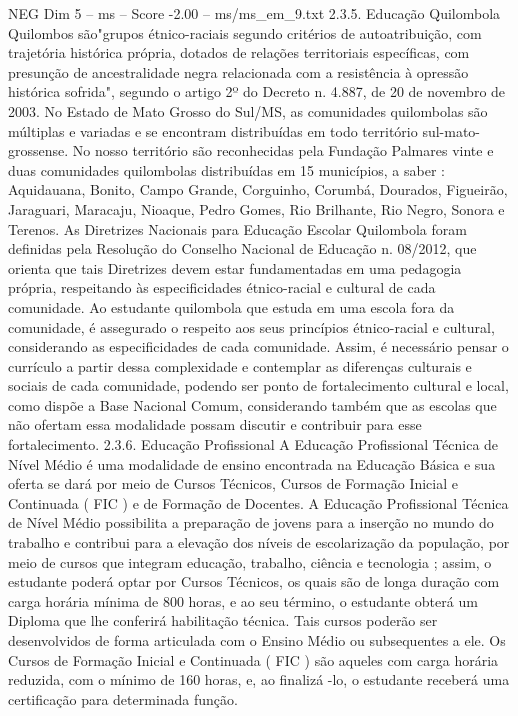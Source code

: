 \begin{textsample}{NEG Dim 5 – ms – Score -2.00 – ms/ms\_em\_9.txt}  \label{ex:f5_neg_071}
2.3.5.
Educação Quilombola Quilombos são"grupos étnico-raciais segundo critérios de autoatribuição, com trajetória histórica própria, dotados de relações territoriais específicas, com presunção de ancestralidade negra relacionada com a resistência à opressão histórica sofrida", segundo o artigo 2º do Decreto n. 4.887, de 20 de novembro de 2003.
No Estado de Mato Grosso do Sul/MS, as comunidades quilombolas são múltiplas e variadas e se encontram distribuídas em todo território sul-mato-grossense.
No nosso território são reconhecidas pela Fundação Palmares vinte e duas comunidades quilombolas distribuídas em 15 municípios, a saber : Aquidauana, Bonito, Campo Grande, Corguinho, Corumbá, Dourados, Figueirão, Jaraguari, Maracaju, Nioaque, Pedro Gomes, Rio Brilhante, Rio Negro, Sonora e Terenos.
As Diretrizes Nacionais para Educação Escolar Quilombola foram definidas pela Resolução do Conselho Nacional de Educação n. 08/2012, que orienta que tais Diretrizes devem estar fundamentadas em uma pedagogia própria, respeitando às especificidades étnico-racial e cultural de cada comunidade.
Ao estudante quilombola que estuda em uma escola fora da comunidade, é assegurado o respeito aos seus princípios étnico-racial e cultural, considerando as especificidades de cada comunidade.
Assim, é necessário pensar o currículo a partir dessa complexidade e contemplar as diferenças culturais e sociais de cada comunidade, podendo ser ponto de fortalecimento cultural e local, como dispõe a Base Nacional Comum, considerando também que as escolas que não ofertam essa modalidade possam discutir e contribuir para esse fortalecimento. 2.3.6.
Educação Profissional A Educação Profissional Técnica de Nível Médio é uma modalidade de ensino encontrada na Educação Básica e sua oferta se dará por meio de Cursos Técnicos, Cursos de Formação Inicial e Continuada ( FIC ) e de Formação de Docentes.
A Educação Profissional Técnica de Nível Médio possibilita a preparação de jovens para a inserção no mundo do trabalho e contribui para a elevação dos níveis de escolarização da população, por meio de cursos que integram educação, trabalho, ciência e tecnologia ; assim, o estudante poderá optar por Cursos Técnicos, os quais são de longa duração com carga horária mínima de 800 horas, e ao seu término, o estudante obterá um Diploma que lhe conferirá habilitação técnica.
Tais cursos poderão ser desenvolvidos de forma articulada com o Ensino Médio ou subsequentes a ele.
Os Cursos de Formação Inicial e Continuada ( FIC ) são aqueles com carga horária reduzida, com o mínimo de 160 horas, e, ao finalizá -lo, o estudante receberá uma certificação para determinada função.

\end{textsample}
